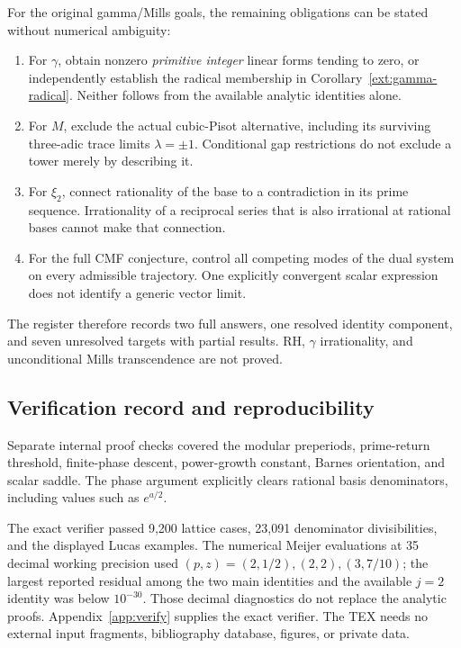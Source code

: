 \documentclass[11pt,a4paper]{article}
\numberwithin{equation}{section}
\theoremstyle{definition}
\theoremstyle{remark}
\begin{document}
For the original gamma/Mills goals, the remaining obligations can be
stated without numerical ambiguity:
\begin{enumerate}
\item For $\gamma$, obtain nonzero \emph{primitive integer} linear
forms tending to zero, or independently establish the radical
membership in Corollary~\ref{ext:gamma-radical}. Neither follows
from the available analytic identities alone.
\item For $M$, exclude the actual cubic-Pisot alternative, including
its surviving three-adic trace limits $\lambda=\pm1$. Conditional
gap restrictions do not exclude a tower merely by describing it.
\item For $\xi_2$, connect rationality of the base to a contradiction
in its prime sequence. Irrationality of a reciprocal series that is
also irrational at rational bases cannot make that connection.
\item For the full CMF conjecture, control all competing modes of
the dual system on every admissible trajectory. One explicitly
convergent scalar expression does not identify a generic vector limit.
\end{enumerate}

The register therefore records two full answers, one resolved identity
component, and seven unresolved targets with partial results. RH,
$\gamma$ irrationality, and unconditional Mills transcendence are not proved.

\subsection{Verification record and reproducibility}

Separate internal proof checks covered the modular preperiods,
prime-return threshold, finite-phase descent, power-growth constant,
Barnes orientation, and scalar saddle. The phase argument explicitly
clears rational basis denominators, including values such as $e^{a/2}$.

The exact verifier passed 9,200 lattice cases, 23,091 denominator
divisibilities, and the displayed Lucas examples.
The numerical Meijer evaluations at 35 decimal working precision used
$(p,z)=(2,1/2),(2,2),(3,7/10)$; the largest reported residual among
the two main identities and the available $j=2$ identity was below
$10^{-30}$. Those decimal diagnostics do not replace the analytic proofs.
Appendix~\ref{app:verify} supplies the exact verifier. The TEX needs no
external input fragments, bibliography database, figures, or private data.
\end{document}
